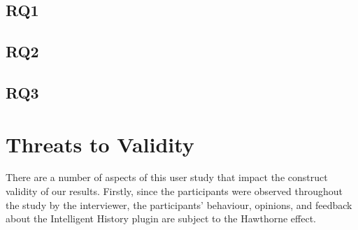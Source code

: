 \subsection{RQ1}

\subsection{RQ2}

\subsection{RQ3}

\section{Threats to Validity}
\label{sec:Threads-to-Validity}

There are a number of aspects of this user study that impact the construct validity of our results.
Firstly, since the participants were observed throughout the study by the interviewer, the participants' behaviour, opinions, and feedback about the Intelligent History plugin are subject to the Hawthorne effect.


\endinput

Any text after an \endinput is ignored.
You could put scraps here or things in progress.